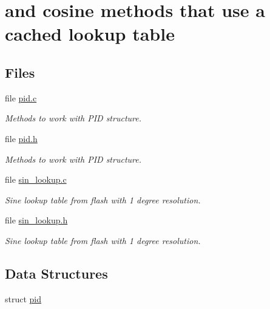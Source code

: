 \hypertarget{group___sine}{\section{and cosine methods that use a cached lookup table}
\label{group___sine}
}
\subsection*{Files}
\begin{DoxyCompactItemize}
\item 
file \hyperlink{pid_8c}{pid.\-c}
\begin{DoxyCompactList}\small\item\em Methods to work with P\-I\-D structure. \end{DoxyCompactList}\item 
file \hyperlink{pid_8h}{pid.\-h}
\begin{DoxyCompactList}\small\item\em Methods to work with P\-I\-D structure. \end{DoxyCompactList}\item 
file \hyperlink{sin__lookup_8c}{sin\-\_\-lookup.\-c}
\begin{DoxyCompactList}\small\item\em Sine lookup table from flash with 1 degree resolution. \end{DoxyCompactList}\item 
file \hyperlink{sin__lookup_8h}{sin\-\_\-lookup.\-h}
\begin{DoxyCompactList}\small\item\em Sine lookup table from flash with 1 degree resolution. \end{DoxyCompactList}\end{DoxyCompactItemize}
\subsection*{Data Structures}
\begin{DoxyCompactItemize}
\item 
struct \hyperlink{structpid}{pid}
\end{DoxyCompactItemize}
